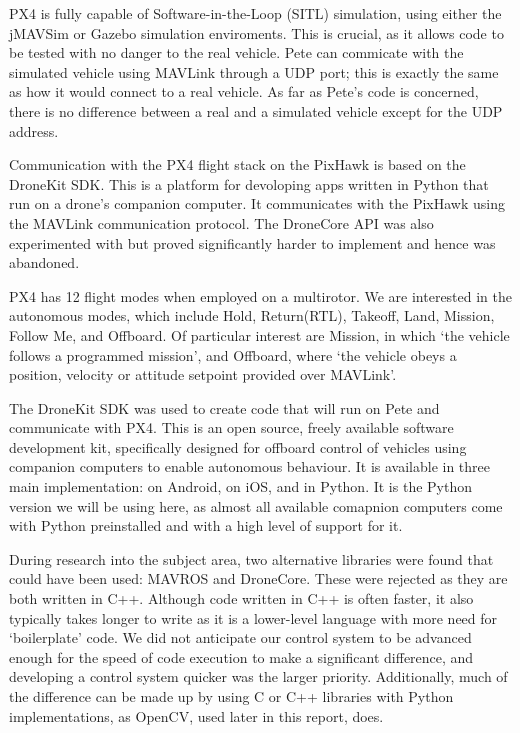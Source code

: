 \documentclass[11pt]{article}
\begin{document}
PX4 is fully capable of Software-in-the-Loop (SITL) simulation, using either the jMAVSim or Gazebo simulation enviroments. This is crucial, as it allows code to be tested with no danger to the real vehicle. Pete can commicate with the simulated vehicle using MAVLink through a UDP port; this is exactly the same as how it would connect to a real vehicle. As far as Pete's code is concerned, there is no difference between a real and a simulated vehicle except for the UDP address.

Communication with the PX4 flight stack on the PixHawk is based on the DroneKit SDK. This is a platform for devoloping apps written in Python that run on a drone's companion computer. It communicates with the PixHawk using the MAVLink communication protocol.\cite{dronekit} The DroneCore API was also experimented with but proved significantly harder to implement and hence was abandoned.

PX4 has 12 flight modes when employed on a multirotor. We are interested in the autonomous modes, which include Hold, Return(RTL), Takeoff, Land, Mission, Follow Me, and Offboard. Of particular interest are Mission, in which `the vehicle follows a programmed mission', and Offboard, where `the vehicle obeys a position, velocity or attitude setpoint provided over MAVLink'.\cite{PX4_user_guide}

The DroneKit SDK was used to create code that will run on Pete and communicate with PX4. This is an open source, freely available software development kit, specifically designed for offboard control of vehicles using companion computers to enable autonomous behaviour. It is available in three main implementation: on Android, on iOS, and in Python. It is the Python version we will be using here, as almost all available comapnion computers come with Python preinstalled and with a high level of support for it.

During research into the subject area, two alternative libraries were found that could have been used: MAVROS and DroneCore. These were rejected as they are both written in C++. Although code written in C++ is often faster, it also typically takes longer to write as it is a lower-level language with more need for `boilerplate' code. We did not anticipate our control system to be advanced enough for the speed of code execution to make a significant difference, and developing a control system quicker was the larger priority.
Additionally, much of the difference can be made up by using C or C++ libraries with Python implementations, as OpenCV, used later in this report, does.
\end{document}
